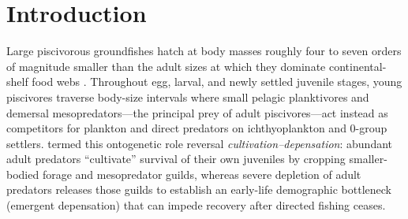 \documentclass[11pt,letterpaper]{article}
\begin{document}
\section{Introduction}

Large piscivorous groundfishes hatch at body masses roughly four to seven orders of magnitude smaller than the adult sizes at which they dominate continental-shelf food webs \citep{walters2001cultivation,andersen2019fish}. Throughout egg, larval, and newly settled juvenile stages, young piscivores traverse body-size intervals where small pelagic planktivores and demersal mesopredators---the principal prey of adult piscivores---act instead as competitors for plankton and direct predators on ichthyoplankton and $0$-group settlers. \citet{walters2001cultivation} termed this ontogenetic role reversal \emph{cultivation--depensation}: abundant adult predators ``cultivate'' survival of their own juveniles by cropping smaller-bodied forage and mesopredator guilds, whereas severe depletion of adult predators releases those guilds to establish an early-life demographic bottleneck (emergent depensation) that can impede recovery after directed fishing ceases.
\end{document}
